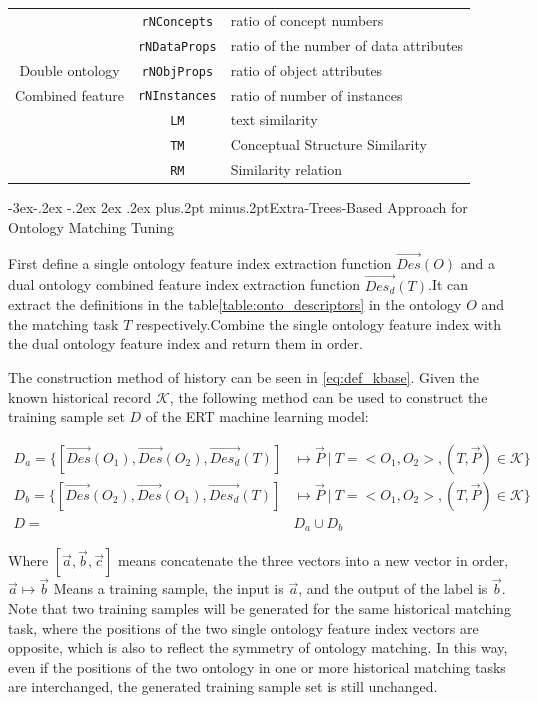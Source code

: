 \documentclass[twoside]{article}
\makeatletter
\def\subsection{\@startsection{subsection}{2}{\z@}%
 {-3ex\@plus -.2ex \@minus -.2ex}%
 {2ex \@plus.2ex}%
{\normalfont\normalsize\protect\baselineskip=12.5pt plus.2pt minus.2pt\bfseries}}
\makeatother
\begin{document}
\begin{table}[htb!]
\begin{tabular}{@{}c|c|l@{}}
					& \texttt {rNConcepts} 	& ratio of concept numbers \\
					& \texttt {rNDataProps} & ratio of the number of data attributes \\
Double ontology     & \texttt {rNObjProps} 	& ratio of object attributes \\
Combined feature 	& \texttt {rNInstances} & ratio of number of instances \\
					& \texttt {LM} 			& text similarity \\
					& \texttt {TM} 			& Conceptual Structure Similarity \\
					& \texttt {RM} 			& Similarity relation \\ \bottomrule
\end{tabular}
\end{table}

\subsection{Extra-Trees-Based Approach for Ontology Matching Tuning}

First define a single ontology feature index extraction function $\vec{Des}(O)$ and a dual ontology combined feature index extraction function $\vec{Des_d}(T)$.It can extract the definitions in the table\ref{table:onto_descriptors} in the ontology $O$ and the matching task $T$ respectively.Combine the single ontology feature index with the dual ontology feature index and return them in order.

The construction method of history can be seen in \ref{eq:def_kbase}.
Given the known historical record $\mathcal{K}$, the following method can be used to construct the training sample set $D$ of the ERT machine learning model:

\begin{align}
D_a = \{ [\vec{Des}(O_1), \vec{Des}(O_2), \vec{Des_d}(T)] &\mapsto \vec{P} \ | \ T = <O_1,O_2>, (T,\vec{P}) \in \mathcal{K} \} \\
D_b = \{ [\vec{Des}(O_2), \vec{Des}(O_1), \vec{Des_d}(T)] &\mapsto \vec{P} \ | \ T = <O_1,O_2>, (T,\vec{P}) \in \mathcal{K} \} \\
D =& D_a \cup D_b
\end{align}

Where $[\vec{a},\vec{b},\vec{c}]$ means concatenate the three vectors into a new vector in order, $\vec{a}\mapsto\vec{b}$ Means a training sample, the input is $\vec{a}$, and the output of the label is $\vec{b}$.
Note that two training samples will be generated for the same historical matching task, where the positions of the two single ontology feature index vectors are opposite, which is also to reflect the symmetry of ontology matching.
In this way, even if the positions of the two ontology in one or more historical matching tasks are interchanged, the generated training sample set is still unchanged.
\end{document}
